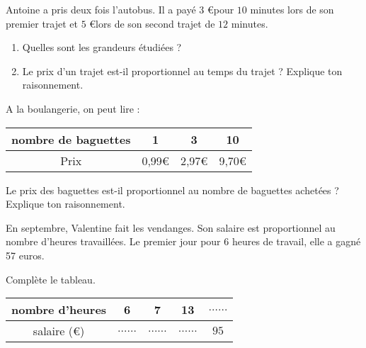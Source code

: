 \begin{pageAuto}
 
\ExoAuto

Antoine a pris deux fois l'autobus. Il a payé $3$ \euro pour $10$ minutes lors de son premier trajet et $5$ \euro lors de son second trajet de $12$ minutes. 
\begin{enumerate}[leftmargin=*]
\item Quelles sont les grandeurs étudiées ? 
\item Le prix d'un trajet est-il proportionnel au temps du trajet ? Explique ton raisonnement.
\end{enumerate}

\ExoAuto

A la boulangerie, on peut lire :
\begin{center}
\begin{tabular}{|c|c|c|c|}
\hline 
nombre de baguettes & 1 & 3 & 10 \\ 
\hline 
Prix  & 0,99\euro & 2,97\euro & 9,70\euro \\ 
\hline 
\end{tabular} 
\end{center}
Le prix des baguettes est-il proportionnel au nombre de baguettes achetées ? Explique ton raisonnement.

 

\ExoAuto

 

En septembre, Valentine fait les vendanges. Son salaire est proportionnel au nombre d'heures travaillées. Le premier jour pour 6 heures de travail, elle a gagné 57 euros.

 Complète le tableau.

\begin{center}
\begin{tabular}{|c|c|c|c|c|}
\hline 
nombre d'heures & 6 & 7 & 13 & $\ldots\ldots$ \\ 
\hline 
salaire (\euro) & $\ldots\ldots$ & $\ldots\ldots$   & $\ldots\ldots$  & $95$   \\ 
\hline 
\end{tabular} 
\end{center}
 
  

\end{pageAuto}
\begin{pageBrouillon} 
 

\end{pageBrouillon}


